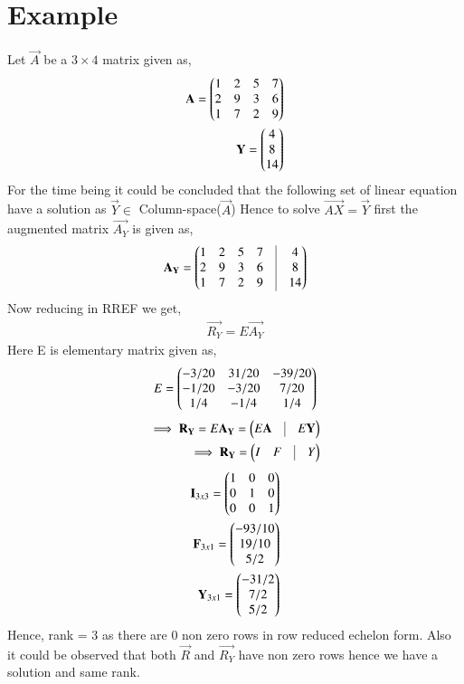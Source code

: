 \documentclass[journal,12pt,twocolumn]{IEEEtran}
\begin{document}
\section{Example}
Let $\vec{A}$ be a $3\times 4$ matrix given as,
\begin{align}
\mathbf{A} = \begin{pmatrix}1&2&5&7\\2&9&3&6\\1&7&2&9\end{pmatrix}\\
\mathbf{Y} = \begin{pmatrix}4\\8\\14\end{pmatrix}
\end{align}
For the time being it could be concluded that the following set of linear equation have a solution as $\vec{Y} \in$ Column-space($\vec{A}$)
Hence to solve $\vec{AX} = \vec{Y}$ first the augmented matrix $\vec{A_Y}$ is given as,
\begin{align}
\vec{A_Y} = \myvec{1&2&5&7&\vrule&4\\2&9&3&6&\vrule&8\\1&7&2&9&\vrule&14}
\end{align}
Now reducing in RREF we get,
\begin{align}
\vec{R_Y} = E\vec{A_Y}
\end{align}
Here E is elementary matrix given as,
\begin{align}
E = \begin{pmatrix}-3/20&31/20&-39/20\\-1/20&-3/20&7/20\\1/4&-1/4&1/4\end{pmatrix}
\end{align}
\begin{align}
\implies \vec{R_Y} = E\vec{A_Y} = \myvec{E\vec{A}&\vrule&E\vec{Y}}\\
\implies \vec{R_Y} =\myvec{I&F&\vrule&Y} 
\end{align}
\begin{align}
\mathbf{I}_{3x3} = \begin{pmatrix}1&0&0\\0&1&0\\0&0&1\end{pmatrix}\\
\mathbf{F}_{3x1} = \begin{pmatrix}-93/10\\19/10\\5/2\end{pmatrix}\\
\mathbf{Y}_{3x1} = \begin{pmatrix}-31/2\\7/2\\5/2\end{pmatrix}
\end{align}
Hence, rank = 3 as there are 0 non zero rows in row reduced echelon form. Also it could be observed that both $\vec{R}$ and $\vec{R_Y}$ have non zero rows hence we have a solution and same rank.  
\end{document}

